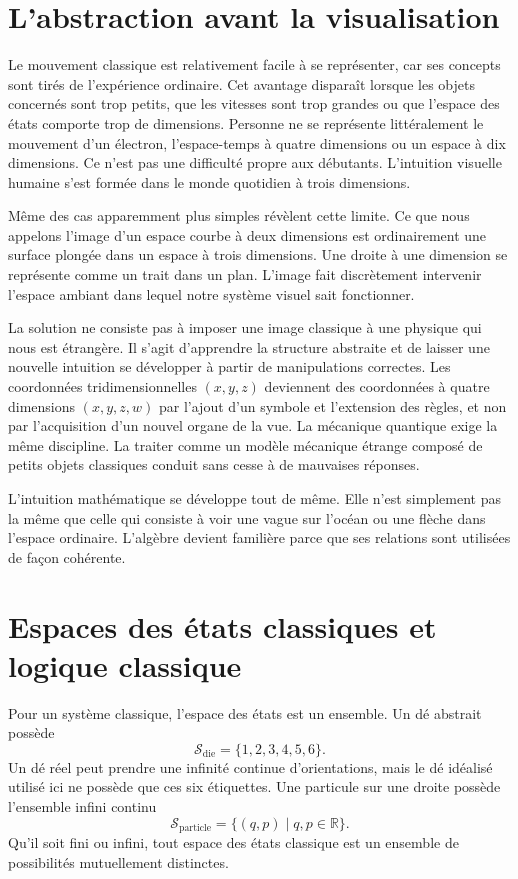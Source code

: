 \section{L’abstraction avant la visualisation}

Le mouvement classique est relativement facile à se représenter, car ses concepts sont tirés de l’expérience ordinaire. Cet avantage disparaît lorsque les objets concernés sont trop petits, que les vitesses sont trop grandes ou que l’espace des états comporte trop de dimensions. Personne ne se représente littéralement le mouvement d’un électron, l’espace-temps à quatre dimensions ou un espace à dix dimensions. Ce n’est pas une difficulté propre aux débutants. L’intuition visuelle humaine s’est formée dans le monde quotidien à trois dimensions.

Même des cas apparemment plus simples révèlent cette limite. Ce que nous appelons l’image d’un espace courbe à deux dimensions est ordinairement une surface plongée dans un espace à trois dimensions. Une droite à une dimension se représente comme un trait dans un plan. L’image fait discrètement intervenir l’espace ambiant dans lequel notre système visuel sait fonctionner.

La solution ne consiste pas à imposer une image classique à une physique qui nous est étrangère. Il s’agit d’apprendre la structure abstraite et de laisser une nouvelle intuition se développer à partir de manipulations correctes. Les coordonnées tridimensionnelles \((x,y,z)\) deviennent des coordonnées à quatre dimensions \((x,y,z,w)\) par l’ajout d’un symbole et l’extension des règles, et non par l’acquisition d’un nouvel organe de la vue. La mécanique quantique exige la même discipline. La traiter comme un modèle mécanique étrange composé de petits objets classiques conduit sans cesse à de mauvaises réponses.

\begin{remark}
L’intuition mathématique se développe tout de même. Elle n’est simplement pas la même que celle qui consiste à voir une vague sur l’océan ou une flèche dans l’espace ordinaire. L’algèbre devient familière parce que ses relations sont utilisées de façon cohérente.
\end{remark}

\section{Espaces des états classiques et logique classique}

Pour un système classique, l’espace des états est un ensemble. Un dé abstrait possède
\begin{equation}
  \mathcal S_{\mathrm{die}}=\{1,2,3,4,5,6\}.
\end{equation}
Un dé réel peut prendre une infinité continue d’orientations, mais le dé idéalisé utilisé ici ne possède que ces six étiquettes. Une particule sur une droite possède l’ensemble infini continu
\begin{equation}
  \mathcal S_{\mathrm{particle}}
  =
  \{(q,p)\mid q,p\in\mathbb R\}.
\end{equation}
Qu’il soit fini ou infini, tout espace des états classique est un ensemble de possibilités mutuellement distinctes.

